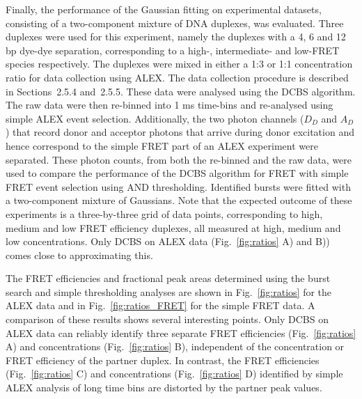 Finally, the performance of the Gaussian fitting on experimental datasets, consisting of a two-component mixture of DNA duplexes, was evaluated. Three duplexes were used for this experiment, namely the duplexes with a 4, 6 and 12 bp dye-dye separation, corresponding to a high-, intermediate- and low-FRET species respectively. The duplexes were mixed in either a 1:3 or 1:1 concentration ratio for data collection using ALEX. The data collection procedure is described in Sections~2.5.4 and~2.5.5. These data were analysed using the DCBS algorithm. The raw data were then re-binned into 1 ms time-bins and re-analysed using simple ALEX event selection. Additionally, the two photon channels ($D_D$ and $A_D$) that record donor and acceptor photons that arrive during donor excitation and hence correspond to the simple FRET part of an ALEX experiment were separated. These photon counts, from both the re-binned and the raw data, were used to compare the performance of the DCBS algorithm for FRET with simple FRET event selection using AND thresholding. Identified bursts were fitted with a two-component mixture of Gaussians. Note that the expected outcome of these experiments is a three-by-three grid of data points, corresponding to high, medium and low FRET efficiency duplexes, all measured at high, medium and low concentrations. Only DCBS on ALEX data (Fig.~\ref{fig:ratios} A) and B)) comes close to approximating this.

The FRET efficiencies and fractional peak areas determined using the burst search and simple thresholding analyses are shown in Fig.~\ref{fig:ratios} for the ALEX data and in Fig.~\ref{fig:ratios_FRET} for the simple FRET data. A comparison of these results shows several interesting points. Only DCBS on ALEX data can reliably identify three separate FRET efficiencies (Fig.~\ref{fig:ratios} A) and concentrations (Fig.~\ref{fig:ratios} B), independent of the concentration or FRET efficiency of the partner duplex. In contrast, the FRET efficiencies (Fig.~\ref{fig:ratios} C) and concentrations (Fig.~\ref{fig:ratios} D) identified by simple ALEX analysis of long time bins are distorted by the partner peak values.

